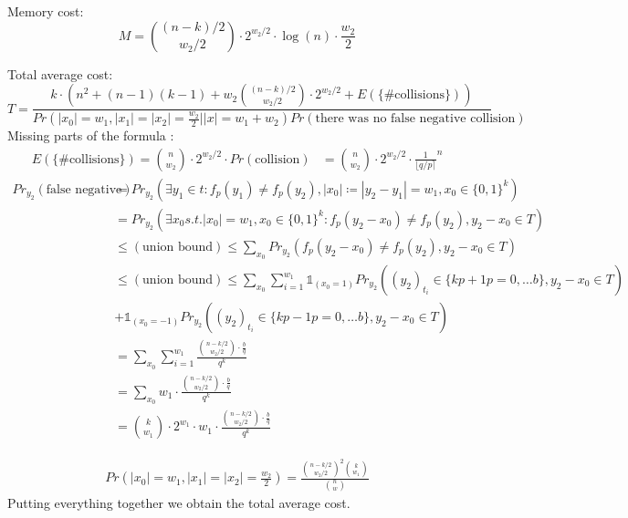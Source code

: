 \documentclass[12pt]{article}
\begin{document}
Memory cost:
\[
M = \binom{(n-k)/2}{w_2/2} \cdot 2^{w_2/2} \cdot \log(n) \cdot \frac{w_2}{2}
\]

Total average cost:
\[
    T = \frac{k \cdot (n^2 + (n-1)(k-1) + w_2\binom{(n-k)/2}{w_2/2} \cdot 2^{w_2/2} + E(\{\text{\# collisions}\}))}{Pr(|x_0| = w_1, |x_1| = |x_2| = \frac{w_2}{2} | |x| = w_1+w_2)Pr(\text{there was no false negative collision})}
\]
Missing parts of the formula :
\[
\begin{split}
    E(\{\text{\# collisions}\}) = \binom{n}{w_2} \cdot 2^{w_2/2} \cdot Pr(\text{collision})
                                & = \binom{n}{w_2} \cdot 2^{w_2/2} \cdot \frac{1}{\lfloor q/p \rceil}^{n}
\end{split}
\]
\[
\begin{split}
    Pr_{y_2}(\text{false negative}) & = Pr_{y_2}(\exists y_1 \in t: f_p(y_1) \neq f_p(y_2), |x_0| \coloneqq |y_2 - y_1| = w_1, x_0 \in \{0,1\}^{k}) \\
    & = Pr_{y_2}(\exists x_0 s.t. |x_0| = w_1, x_0 \in\{0,1\}^{k}: f_p(y_2 - x_0) \neq f_p(y_2), y_2 - x_0 \in T) \\
    & \leq (\text{union bound}) \leq \sum_{x_0} Pr_{y_2}(f_p(y_2 - x_0) \neq f_p(y_2), y_2 - x_0 \in T) \\
    & \leq (\text{union bound}) \leq \sum_{x_0} \sum_{i = 1}^{w_1} \mathds{1}_{(x_0 = 1)}Pr_{y_2}((y_2)_{t_i} \in \{kp+1 p=0, \dots b\}, y_2 - x_0 \in T) \\
    & + \mathds{1}_{(x_0 = -1)}Pr_{y_2}((y_2)_{t_i} \in \{kp-1 p=0, \dots b\}, y_2 - x_0 \in T) \\
    & = \sum_{x_0} \sum_{i = 1}^{w_1} \frac{\binom{n-k/2}{w_2/2} \cdot \frac{b}{q}}{q^k} \\
    & = \sum_{x_0} w_1 \cdot \frac{\binom{n-k/2}{w_2/2} \cdot \frac{b}{q}}{q^k} \\
    & = \binom{k}{w_1} \cdot 2^{w_1} \cdot w_1 \cdot \frac{\binom{n-k/2}{w_2/2} \cdot \frac{b}{q}}{q^k}
\end{split}
\]

\[
\begin{split}
    Pr(|x_0| = w_1, |x_1| = |x_2| = \frac{w_2}{2}) = \frac{\binom{n-k/2}{w_2/2}^{2}\binom{k}{w_1}}{\binom{n}{w}}
\end{split}
\]
Putting everything together we obtain the total average cost.



\end{document}
